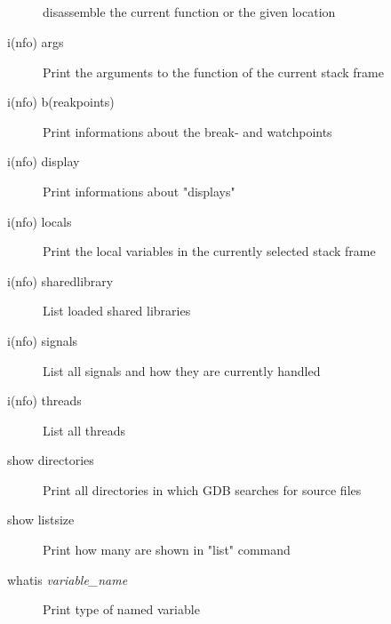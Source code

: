\documentclass[10pt,landscape,a4paper]{article}
\newcommand{\blacksubsection}[1]{\subsection{\colorbox{black}{\makebox[\linewidth][c]{\textcolor{white}{#1}}}}}
\begin{document}
\begin{multicols}{3}
    \blacksubsection{Informations}
      \begin{description}
        \item[\parbox{6cm}{ \vspace{0.1cm} disassemble \\ disassemble \textit{<where>} \vspace{0.1cm}}]
              disassemble the current function or the given location
        \item[i(nfo) args] Print the arguments to the function of the current stack frame
        \item[i(nfo) b(reakpoints)] Print informations about the break- and watchpoints
        \item[i(nfo) display] Print informations about "displays"
        \item[i(nfo) locals] Print the local variables in the currently selected stack frame
        \item[i(nfo) sharedlibrary] List loaded shared libraries
        \item[i(nfo) signals] List all signals and how they are currently handled
        \item[i(nfo) threads] List all threads
        \item[show directories] Print all directories in which GDB searches for source files
        \item[show listsize] Print how many are shown in "list" command
        \item[whatis \textit{variable\_name}] Print type of named variable
      \end{description}

  \end{multicols}
\end{document}
